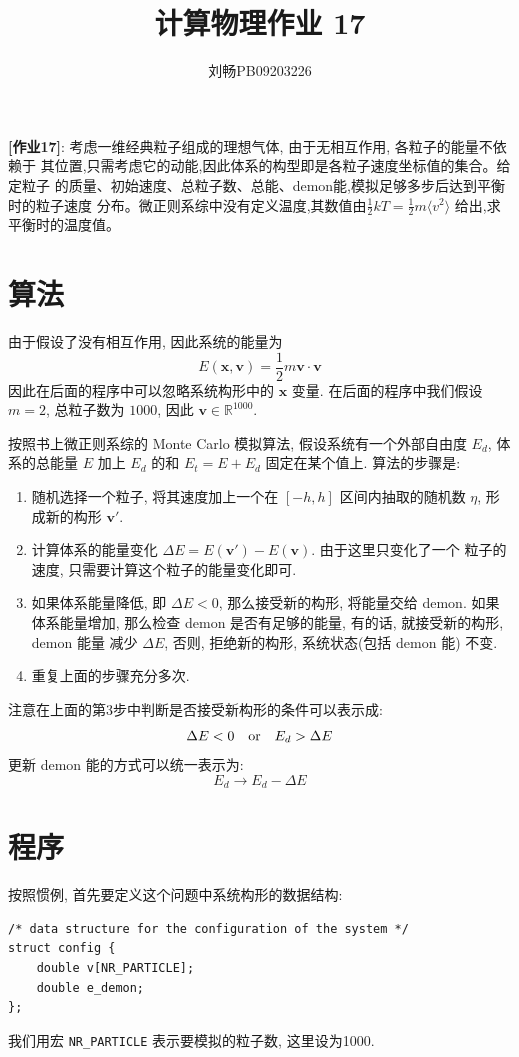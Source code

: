 \documentclass{ctexart}
\def\vec#1{\mathbf{#1}}
\begin{document}
\title{计算物理作业 17}
\author{刘畅\qquad PB09203226}
\maketitle

{\bf [作业17]}: 考虑一维经典粒子组成的理想气体, 由于无相互作用, 各粒子的能量不依赖于
其位置,只需考虑它的动能,因此体系的构型即是各粒子速度坐标值的集合。给定粒子
的质量、初始速度、总粒子数、总能、demon能,模拟足够多步后达到平衡时的粒子速度
分布。微正则系综中没有定义温度,其数值由$\frac{1}{2}kT=\frac{1}{2}m\langle v^2\rangle$
给出,求平衡时的温度值。

\section{算法}
由于假设了没有相互作用, 因此系统的能量为
\[
E(\vec x,\vec v) = \frac{1}{2}m\vec v\cdot\vec v
\]
因此在后面的程序中可以忽略系统构形中的 $\vec x$ 变量. 在后面的程序中我们假设 $m = 2$,
总粒子数为 $1000$, 因此 $\vec v\in\mathbb{R}^{1000}$.

按照书上微正则系综的 Monte Carlo 模拟算法, 假设系统有一个外部自由度 $E_d$, 体系的总能量
$E$ 加上 $E_d$ 的和 $E_t = E + E_d$ 固定在某个值上. 算法的步骤是:
\begin{enumerate}
\item 随机选择一个粒子, 将其速度加上一个在 $[-h,h]$ 区间内抽取的随机数 $\eta$,
形成新的构形 $\vec v'$.
\item 计算体系的能量变化 $\Delta E = E(\vec v') - E(\vec v)$. 由于这里只变化了一个
粒子的速度, 只需要计算这个粒子的能量变化即可.
\item 如果体系能量降低, 即 $\Delta E < 0$, 那么接受新的构形, 将能量交给 demon.
如果体系能量增加, 那么检查 demon 是否有足够的能量, 有的话, 就接受新的构形, demon 能量
减少 $\Delta E$, 否则, 拒绝新的构形, 系统状态(包括 demon 能) 不变.
\item 重复上面的步骤充分多次.
\end{enumerate}

注意在上面的第3步中判断是否接受新构形的条件可以表示成:
\begin{equation}\label{cond}
\Delta E < 0 \quad{\rm or}\quad E_d > \Delta E
\end{equation}
更新 demon 能的方式可以统一表示为:
\begin{equation}\label{update}
E_d \to E_d - \Delta E
\end{equation}

\section{程序}
按照惯例, 首先要定义这个问题中系统构形的数据结构:
\begin{verbatim}
/* data structure for the configuration of the system */
struct config {
    double v[NR_PARTICLE];
    double e_demon;
};
\end{verbatim}
我们用宏 \verb|NR_PARTICLE| 表示要模拟的粒子数, 这里设为1000.
\end{document}
